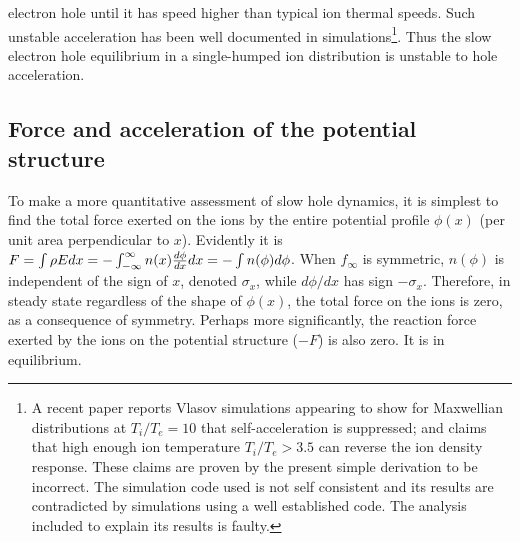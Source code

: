 \documentclass[pre]{revtex4-2}
\begin{document}
electron hole until it has speed higher than typical ion thermal
speeds. Such unstable acceleration has been well documented in
simulations\cite{Eliasson2004,Zhou2016}\footnote{A recent
  paper reports Vlasov simulations
  appearing to show for Maxwellian distributions at $T_i/T_e=10$ that
  self-acceleration is suppressed; and claims that high enough ion
  temperature $T_i/T_e>3.5$ can reverse the ion density
  response. These claims are proven by the present simple derivation
  to be incorrect.  The simulation code used is not self consistent
  and its results are contradicted by simulations using a well
  established code. The analysis included to explain its results is
  faulty.}.  Thus the slow electron hole equilibrium in a
single-humped ion distribution is unstable to hole acceleration.

\subsection{Force and acceleration of the potential structure}

To make a more quantitative assessment of slow hole dynamics, it is
simplest to find the total force exerted on the ions by the entire
potential profile $\phi(x)$ (per unit area perpendicular to
$x$). Evidently it is
$F=\int \rho Edx=-\int_{-\infty}^{\infty} n(x) {d\phi\over dx}dx
=-\int n(\phi) d\phi$. When $f_\infty$ is symmetric, $n(\phi)$ is
independent of the sign of $x$, denoted $\sigma_x$, while $d\phi/dx$ has sign
$-\sigma_x$. Therefore, in steady state regardless of the shape of
$\phi(x)$, the total force on the ions is zero, as a consequence of
symmetry. Perhaps more significantly, the reaction force exerted by
the ions on the potential structure ($-F$) is also zero. It is in
equilibrium.
\end{document}
